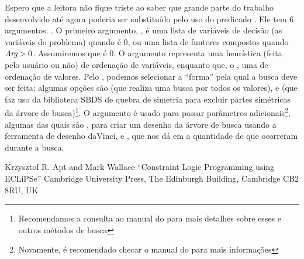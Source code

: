 Espero que a leitora não fique triste ao saber que grande parte do trabalho desenvolvido até agora
poderia ser substituído pelo uso do predicado . Ele tem 6 argumentos:
. O primeiro argumento,
, é uma lista de variáveis de decisão (as variáveis do problema) quando  é 0, ou
uma lista de funtores compostos quando $\textit{Arg} > 0$. Assumiremos que  é 0. O argumento 
representa uma heurística (feita pelo usuário ou não) de ordenação de variáveis, enquanto que, o
, uma de ordenação de valores. Pelo , podemos selecionar a ``forma'' pela
qual a busca deve ser feita: algumas opções são  (que realiza uma busca por
todos os valores), e  (que faz uso da biblioteca SBDS de quebra de simetria para
excluir partes simétricas da árvore de busca)\footnote{Recomendamos a consulta ao manual do \eclipse
para mais detalhes sobre esses e outros métodos de busca}. O argumento  é usado para
passar parâmetros adicionais\footnote{Novamente, é recomendado checar o manual do \eclipse para mais
informações}, algumas das quais são , para criar um desenho da
árvore de busca usando a ferramenta de desenho daVinci, e , que nos dá em
 a quantidade de  que ocorreram durante a busca.




  \begin{thebibliography}{2}

    Krzysztof R. Apt and Mark Wallace
    ``Constraint Logic Programming using ECLiPSe''
    Cambridge University Press,
    The Edinburgh Building, Cambridge CB2 8RU, UK


  \end{thebibliography}

%
